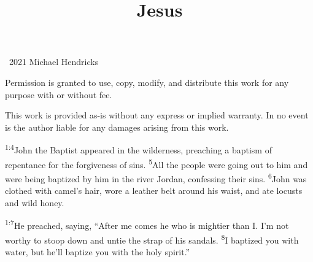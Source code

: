 \documentclass[openany,12pt,english]{book}
\title{Jesus}
\author{}
\date{}
\newenvironment{para}{\par\pretolerance=100\tolerance=200\setlength{\emergencystretch}{0.6em}\relax}{\par}
\begin{document}
\maketitle

{
\thispagestyle{empty}
\vspace*{\fill}
\begin{changemargin}{.8in}{.8in}
\begin{center}
\textcopyright{}~2021 Michael Hendricks

\vspace{0.5\baselineskip}

Permission is granted to use, copy, modify, and distribute
this work for any purpose with or without fee.

\vspace{0.5\baselineskip}

This work is provided as-is without any express or implied
warranty. In no event is the author liable for any damages
arising from this work.
\end{center}
\end{changemargin}
}
\clearpage{}

\clearpage{}

\markboth{}{}


\begin{para}
    \textsuperscript{1:4}\thinspace{}John the Baptist appeared in the wil\-der\-ness, preaching a bap\-tism of re\-pent\-ance for the for\-give\-ness of sins.
    \textsuperscript{5}\thinspace{}All the peo\-ple were go\-ing out to him and were be\-ing bap\-tized by him in the riv\-er Jor\-dan, con\-fess\-ing their sins.
    \textsuperscript{6}\thinspace{}John was clothed with camel's hair, wore a leath\-er belt a\-round his waist, and ate locusts and wild hon\-ey.
\end{para}

\begin{para}
    \textsuperscript{1:7}\thinspace{}He preached, say\-ing, “Af\-ter me co\-mes he who is might\-i\-er than I. I'm not wor\-thy to stoop down and un\-tie the strap of his sandals.
    \textsuperscript{8}\thinspace{}I bap\-tized you with wa\-ter, but he'll bap\-tize you with the ho\-ly spir\-it.”
\end{para}
\end{document}
